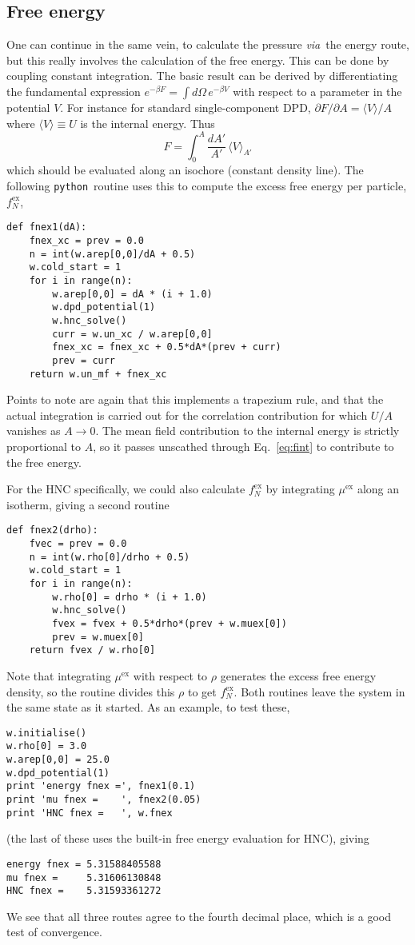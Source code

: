 \documentclass[12pt,a4paper]{article}
\newcommand{\latin}[1]{\emph{#1}}
\newcommand{\via}{\latin{via}}
\newcommand{\myex}{^{\mathrm{ex}}}
\newcommand{\muex}{\mu\myex}
\newcommand{\fNex}{f_N\myex}
\newcommand{\Eqref}[1]{Eq.~\eqref{#1}}
\newcommand{\python}{{\tt python}}
\begin{document}
\subsection{Free energy}
\label{sec:feng}
%
One can continue in the same vein, to calculate the pressure \via\ the
energy route, but this really involves the calculation of the free
energy.  This can be done by coupling constant integration.  The basic
result can be derived by differentiating the fundamental expression
$e^{-\beta F} = \int\!d\Omega\,e^{-\beta V}$ with respect to a
parameter in the potential $V$.  For instance for standard
single-component DPD, ${\partial F}/{\partial A}={\langle
  V\rangle}/{A}$ where $\langle V\rangle\equiv U$ is the internal
energy.  Thus
%
\begin{equation}
F=\int_0^A\frac{dA'}{A'}\,\langle V\rangle_{A'}
\label{eq:fint}
\end{equation}
%
which should be evaluated along an isochore (constant density line).
The following \python\ routine uses this to compute the excess free
energy per particle, $\fNex$,
%
\begin{verbatim}
def fnex1(dA):
    fnex_xc = prev = 0.0
    n = int(w.arep[0,0]/dA + 0.5)
    w.cold_start = 1
    for i in range(n):
        w.arep[0,0] = dA * (i + 1.0)
        w.dpd_potential(1)
        w.hnc_solve()
        curr = w.un_xc / w.arep[0,0]
        fnex_xc = fnex_xc + 0.5*dA*(prev + curr)
        prev = curr
    return w.un_mf + fnex_xc
\end{verbatim}
%
Points to note are again that this implements a trapezium rule, and
that the actual integration is carried out for the correlation
contribution for which $U/A$ vanishes as $A\to0$.  The mean field
contribution to the internal energy is strictly proportional to $A$,
so it passes unscathed through \Eqref{eq:fint} to contribute
to the free energy.

For the HNC specifically, we could also calculate $\fNex$ by integrating
$\muex$ along an isotherm, giving a second routine
%
\begin{verbatim}
def fnex2(drho):
    fvec = prev = 0.0
    n = int(w.rho[0]/drho + 0.5)
    w.cold_start = 1
    for i in range(n):
        w.rho[0] = drho * (i + 1.0)
        w.hnc_solve()
        fvex = fvex + 0.5*drho*(prev + w.muex[0])
        prev = w.muex[0]
    return fvex / w.rho[0]
\end{verbatim}
%
Note that integrating $\muex$ with respect to $\rho$ generates the
excess free energy density, so the routine divides this $\rho$ to get
$\fNex$.  Both routines leave the system in the same state as it
started.  As an example, to test these,
%
\begin{verbatim}
w.initialise()
w.rho[0] = 3.0
w.arep[0,0] = 25.0
w.dpd_potential(1)
print 'energy fnex =', fnex1(0.1)
print 'mu fnex =    ', fnex2(0.05)
print 'HNC fnex =   ', w.fnex
\end{verbatim}
%
(the last of these uses the built-in free energy evaluation for HNC), giving
%
\begin{verbatim}
energy fnex = 5.31588405588
mu fnex =     5.31606130848
HNC fnex =    5.31593361272
\end{verbatim}
%
We see that all three routes agree to the fourth decimal place,
which is a good test of convergence.
\end{document}
